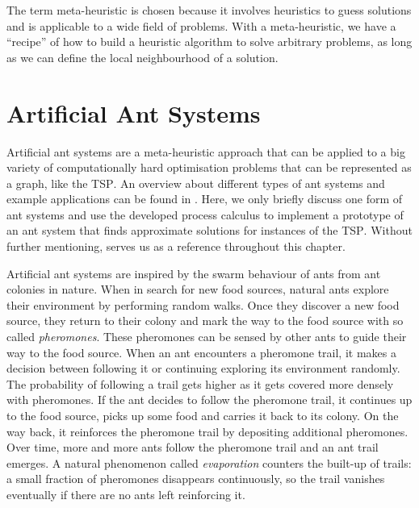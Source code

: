 The term meta-heuristic is chosen because it involves heuristics to guess solutions and is applicable to a wide field of problems. With a meta-heuristic, we have a \enquote{recipe} of how to build a heuristic algorithm to solve arbitrary problems, as long as we can define the local neighbourhood of a solution.

\section{Artificial Ant Systems}
\label{chp:ant_system}
Artificial ant systems are a meta-heuristic approach that can be applied to a big variety of computationally hard optimisation problems that can be represented as a graph, like the \textsc{TSP}. An overview about different types of ant systems and example applications can be found in \cite{Dorigo:2004:ACO:975277}. Here, we only briefly discuss one form of ant systems and use the developed process calculus to implement a prototype of an ant system that finds approximate solutions for instances of the \textsc{TSP}. Without further mentioning, \cite{Dorigo:2004:ACO:975277} serves us as a reference throughout this chapter.

Artificial ant systems are inspired by the swarm behaviour of ants from ant colonies in nature. When in search for new food sources, natural ants explore their environment by performing random walks. Once they discover a new food source, they return to their colony and mark the way to the food source with so called \textit{pheromones}. These pheromones can be sensed by other ants to guide their way to the food source. When an ant encounters a pheromone trail, it makes a decision between following it or continuing exploring its environment randomly. The probability of following a trail gets higher as it gets covered more densely with pheromones. If the ant decides to follow the pheromone trail, it continues up to the food source, picks up some food and carries it back to its colony. On the way back, it reinforces the pheromone trail by depositing additional pheromones. Over time, more and more ants follow the pheromone trail and an ant trail emerges. A natural phenomenon called \textit{evaporation} counters the built-up of trails: a small fraction of pheromones disappears continuously, so the trail vanishes eventually if there are no ants left reinforcing it.

